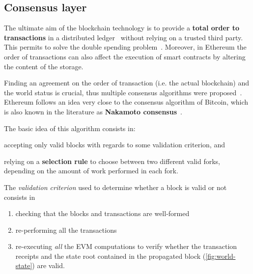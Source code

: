 \subsection{Consensus layer}
\label{sec:consensus}

The ultimate aim of the blockchain technology is to provide a \textbf{total
order to transactions} in a distributed ledger~\cite{bib:the-quest} without
relying on a trusted third party. This permits to solve the double spending
problem~\cite{bib:bitcoin}. Moreover, in Ethereum the order of transactions can
also affect the execution of smart contracts by altering the content of the
storage.

Finding an agreement on the order of transaction (i.e. the actual blockchain)
and the world status is crucial, thus multiple consensus algorithms were
proposed~\cite{}. Ethereum follows an idea very close to the consensus algorithm
of Bitcoin, which is also known in the literature as \textbf{Nakamoto
consensus}~\cite{}.

The basic idea of this algorithm consists in:
\begin{enumerate*}[label=(\arabic*)]
	\item accepting only valid blocks with regards to some validation criterion,
	and
	\item relying on a \textbf{selection rule} to choose between two different
	valid forks, depending on the amount of work performed in each fork.
\end{enumerate*}

The \emph{validation criterion} used to determine whether a block is valid or
not consists in
\begin{enumerate}
	\item checking that the blocks and transactions are well-formed
	\item re-performing all the transactions
	\item re-executing \emph{all}	the EVM computations to verify whether the
	transaction receipts and the state root contained in the propagated block
	(\autoref{fig:world-state}) are valid.
\end{enumerate}

